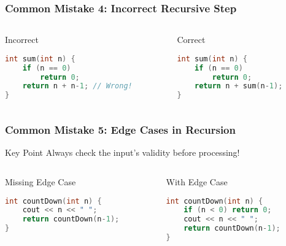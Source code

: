 \documentclass{beamer}
\begin{document}
\begin{frame}[fragile]
\frametitle{Common Mistake 4: Incorrect Recursive Step}
\begin{columns}
\begin{column}{0.48\textwidth}
\begin{block}{Incorrect}
\begin{lstlisting}[language=C++]
int sum(int n) {
    if (n == 0) 
        return 0;
    return n + n-1; // Wrong!
}
\end{lstlisting}
\end{block}
\end{column}

\begin{column}{0.48\textwidth}
\begin{block}{Correct}
\begin{lstlisting}[language=C++]
int sum(int n) {
    if (n == 0) 
        return 0;
    return n + sum(n-1);
}
\end{lstlisting}
\end{block}
\end{column}
\end{columns}
\end{frame}

\begin{frame}[fragile]
\frametitle{Common Mistake 5: Edge Cases in Recursion}
\begin{alertblock}{Key Point}
Always check the input's validity before processing!
\end{alertblock}

\begin{columns}
\begin{column}{0.48\textwidth}
\begin{block}{Missing Edge Case}
\begin{lstlisting}[language=C++]
int countDown(int n) {
    cout << n << " ";
    return countDown(n-1);
}
\end{lstlisting}
\end{block}
\end{column}

\begin{column}{0.48\textwidth}
\begin{block}{With Edge Case}
\begin{lstlisting}[language=C++]
int countDown(int n) {
    if (n < 0) return 0;
    cout << n << " ";
    return countDown(n-1);
}
\end{lstlisting}
\end{block}
\end{column}
\end{columns}
\end{frame}
\end{document}

